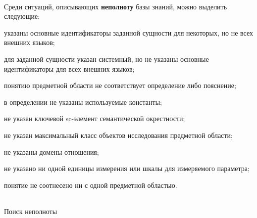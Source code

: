\begin{frame}{\\}
	Среди ситуаций, описывающих \textbf{неполноту} базы знаний, можно выделить
	следующие:
		\begin{textitemize}
			\item указаны основные идентификаторы заданной сущности для некоторых, но не всех внешних языков;
			\item для заданной сущности указан системный, но не указаны основные
			идентификаторы для всех внешних языков;
			\item понятию предметной области не соответствует определение либо
			пояснение;
			\item в определении не указаны используемые константы;
			\item не указан ключевой sc-элемент семантической окрестности;
			\item не указан максимальный класс объектов исследования предметной области;
			\item не указаны домены отношения;
			\item не указано ни одной единицы измерения или шкалы для измеряемого
			параметра;
			\item понятие не соотнесено ни с одной предметной областью.
		\end{textitemize}
\end{frame}

\begin{frame}{\\Поиск неполноты}%
	\begin{SCn}
		
	\end{SCn}
\end{frame}